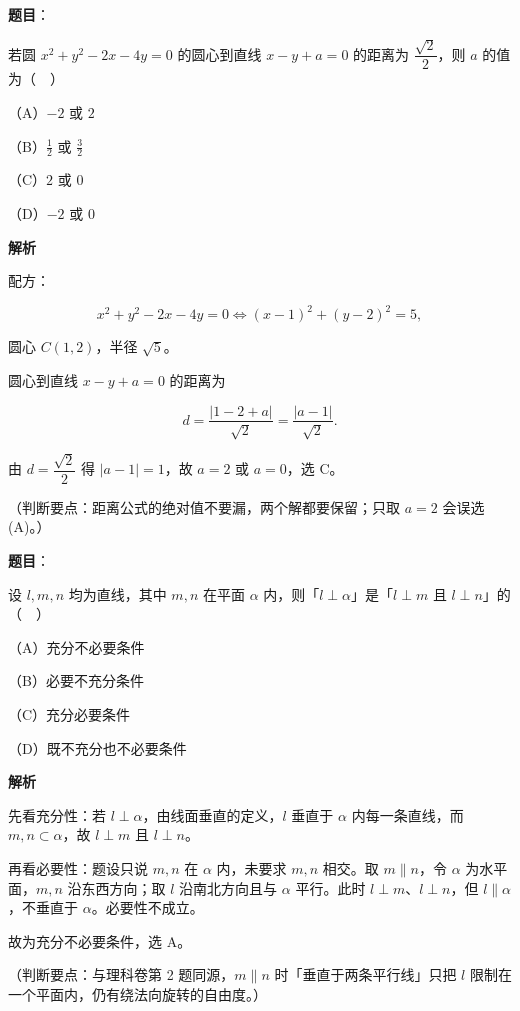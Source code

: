 \begin{answer}

\textbf{题目}：

若圆 $x^2+y^2-2x-4y=0$ 的圆心到直线 $x-y+a=0$ 的距离为 $\dfrac{\sqrt2}{2}$，则 $a$ 的值为（　）

（A）$-2$ 或 $2$

（B）$\frac12$ 或 $\frac32$

（C）$2$ 或 $0$

（D）$-2$ 或 $0$

\textbf{解析}

配方：

\nopagebreak[4]
\[x^2+y^2-2x-4y=0\iff (x-1)^2+(y-2)^2=5,\]

圆心 $C(1,2)$，半径 $\sqrt5$。

圆心到直线 $x-y+a=0$ 的距离为

\nopagebreak[4]
\[d=\frac{|1-2+a|}{\sqrt2}=\frac{|a-1|}{\sqrt2}.\]

由 $d=\dfrac{\sqrt2}{2}$ 得 $|a-1|=1$，故 $a=2$ 或 $a=0$，选 C。

（判断要点：距离公式的绝对值不要漏，两个解都要保留；只取 $a=2$ 会误选 (A)。）


\end{answer}
\begin{answer}

\textbf{题目}：

设 $l,m,n$ 均为直线，其中 $m,n$ 在平面 $\alpha$ 内，则「$l\perp\alpha$」是「$l\perp m$ 且 $l\perp n$」的（　）

（A）充分不必要条件

（B）必要不充分条件

（C）充分必要条件

（D）既不充分也不必要条件

\textbf{解析}

先看充分性：若 $l\perp\alpha$，由线面垂直的定义，$l$ 垂直于 $\alpha$ 内每一条直线，而 $m,n\subset\alpha$，故 $l\perp m$ 且 $l\perp n$。

再看必要性：题设只说 $m,n$ 在 $\alpha$ 内，未要求 $m,n$ 相交。取 $m\parallel n$，令 $\alpha$ 为水平面，$m,n$ 沿东西方向；取 $l$ 沿南北方向且与 $\alpha$ 平行。此时 $l\perp m$、$l\perp n$，但 $l\parallel\alpha$，不垂直于 $\alpha$。必要性不成立。

故为充分不必要条件，选 A。

（判断要点：与理科卷第 2 题同源，$m\parallel n$ 时「垂直于两条平行线」只把 $l$ 限制在一个平面内，仍有绕法向旋转的自由度。）


\end{answer}
